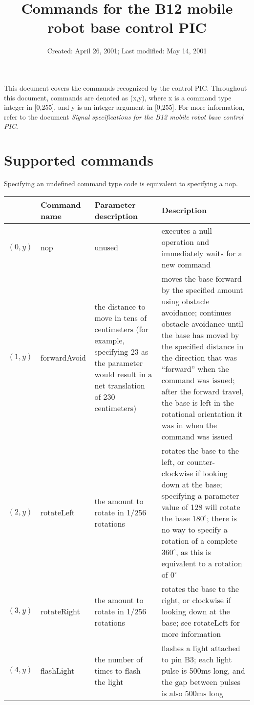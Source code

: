 \documentclass[12pt]{article}
\begin{document}
\title{Commands for the B12 mobile robot base control PIC}
\date{Created: April 26, 2001;  Last modified: May 14, 2001}

\maketitle

This document covers the commands recognized by the control PIC\@.  Throughout this document, commands are denoted as (x,y), where x is a command type integer in [0,255], and y is an integer argument in [0,255].  For more information, refer to the document {\it Signal specifications for the B12 mobile robot base control PIC}. 


\section{Supported commands}
Specifying an undefined command type code is equivalent to specifying a nop.

\begin{tabular}{|l|l|p{2in}|p{2in}|}
\hline
 & {\bf Command name } & {\bf Parameter description} & {\bf Description} \\
\hline
$(0,y)$ 
& nop & unused & executes a null operation and immediately waits for a new command\\
\hline 
$(1,y)$
& forwardAvoid & the distance to move in tens of centimeters (for example, specifying 23 as the parameter would result in a net translation of 230 centimeters)& moves the base forward by the specified amount using obstacle avoidance;  continues obstacle avoidance until the base has moved by the specified distance in the direction that was ``forward'' when the command was issued;  after the forward travel, the base is left in the rotational orientation it was in when the command was issued\\
\hline
$(2,y)$ 
& rotateLeft & the amount to rotate in 1/256 rotations& rotates the base to the left, or counter-clockwise if looking down at the base; specifying a parameter value of 128 will rotate the base $180^\circ$;  there is no way to specify a rotation of a complete $360^\circ$, as this is equivalent to a rotation of $0^\circ$\\
\hline
$(3,y)$ 
& rotateRight & the amount to rotate in 1/256 rotations& rotates the base to the right, or clockwise if looking down at the base; see rotateLeft for more information\\
\hline 
$(4,y)$ 
& flashLight & the number of times to flash the light& flashes a light attached to pin B3;  each light pulse is 500ms long, and the gap between pulses is also 500ms long\\
\hline 

\end{tabular}
\end{document}
